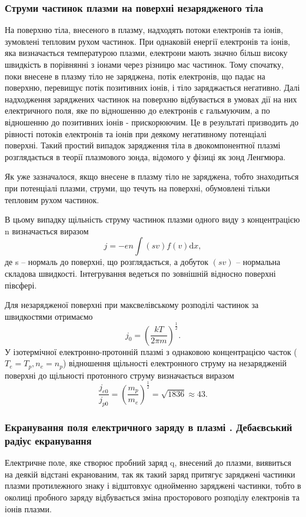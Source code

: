 \documentclass[a4paper,12pt]{article}
\begin{document}
\subsubsection{Струми частинок плазми на поверхні незарядженого тіла}
На поверхню тіла, внесеного в плазму, надходять потоки електронів та іонів, зумовлені тепловим рухом частинок. При однаковій енергії електронів та іонів, яка визначається  температурою плазми, електрони мають значно більш високу швидкість в порівнянні з іонами через різницю мас частинок. Тому спочатку, поки внесене в плазму тіло не заряджена, потік електронів, що падає на поверхню, перевищує потік позитивних іонів, і тіло заряджається негативно. Далі надходження заряджених частинок на поверхню відбувається в умовах дії на них електричного поля, яке по відношенню до електронів є гальмуючим, а по відношенню до позитивних іонів - прискорюючим. Це в результаті призводить до рівності потоків електронів та іонів при деякому негативному потенціалі поверхні. Такий простий випадок зарядження тіла в двокомпонентної плазмі розглядається в теорії плазмового зонда, відомого у фізиці як зонд Ленгмюра.


Як уже зазначалося, якщо внесене в плазму тіло не заряджена, тобто знаходиться при потенціалі плазми, струми, що течуть на поверхні, обумовлені тільки тепловим рухом частинок.


В цьому випадку щільність струму частинок плазми одного виду з концентрацією n визначається виразом
\[
j = -en \int (sv) f(v) \mathrm{d}x,
\]
де s -- нормаль до поверхні, що розглядається, а добуток $(sv)$ -- нормальна складова швидкості. Інтегрування ведеться по зовнішній відносно поверхні півсфері.

Для незарядженої поверхні при максвелівському розподілі частинок за швидкостями отримаємо
\[
j_0 = \left( \frac{kT}{2 \pi m} \right)^\frac{1}{2}.
\]
У ізотермічної електронно-протонній плазмі з однаковою концентрацією часток ($T_e = T_p, n_e = n_p$) відношення щільності електронного струму на незарядженій поверхні до щільності протонного струму визначається виразом \cite{novikov}
\[
\frac{j_{e0}}{j_{p0}} = \left( \frac{m_p}{m_e} \right)^\frac{1}{2} = \sqrt{1836} \approx 43.
\]

\subsubsection{Екранування поля електричного заряду в плазмі
. Дебаєвський радіус екранування}
Електричне поле, яке створює пробний заряд q, внесений до плазми, виявиться на деякій відстані екранованим, так як такий заряд притягує заряджені частинки плазми протилежного знаку і відштовхує однойменно заряджені частинки, тобто в околиці пробного заряду відбувається зміна просторового розподілу електронів та іонів плазми.
\end{document}
